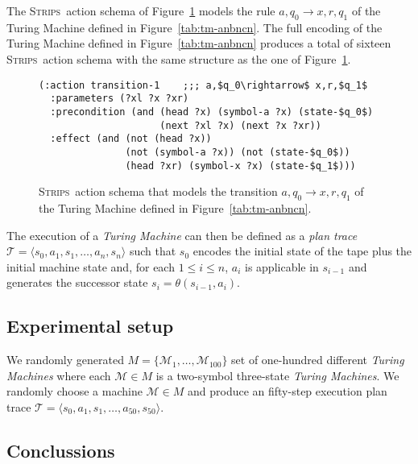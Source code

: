 \documentclass[letterpaper]{article} %
\newcommand{\tup}[1]{{\langle #1 \rangle}}
\newcommand{\strips}{\textsc{Strips}}     %
\begin{document}
The \strips\ action schema of Figure~\ref{fig:update-rule} models the rule $a,q_0\rightarrow x,r,q_1$ of the Turing Machine defined in Figure~\ref{tab:tm-anbncn}. The full encoding of the Turing Machine defined in Figure~\ref{tab:tm-anbncn} produces a total of sixteen \strips\ action schema with the same structure as the one of Figure~\ref{fig:update-rule}. 
\begin{figure}[hbt!]
\begin{scriptsize}
\begin{lstlisting}
(:action transition-1    ;;; a,$q_0\rightarrow$ x,r,$q_1$
  :parameters (?xl ?x ?xr)
  :precondition (and (head ?x) (symbol-a ?x) (state-$q_0$)
                     (next ?xl ?x) (next ?x ?xr))
  :effect (and (not (head ?x)) 
               (not (symbol-a ?x)) (not (state-$q_0$))
               (head ?xr) (symbol-x ?x) (state-$q_1$)))
\end{lstlisting}
\end{scriptsize}
 \caption{\small \strips\ action schema that models the transition $a,q_0\rightarrow x,r,q_1$ of the Turing Machine defined in Figure~\ref{tab:tm-anbncn}.}
\label{fig:update-rule}
\end{figure}

The execution of a {\em Turing Machine} can then be defined as a {\em plan trace} $\mathcal{T}=\tup{s_0,a_1,s_1,\ldots,a_n,s_n}$ such that $s_0$ encodes the initial state of the tape plus the initial machine state and, for each {\small $1\leq i\leq n$}, $a_i$ is applicable in $s_{i-1}$ and generates the successor state $s_i=\theta(s_{i-1},a_i)$. 

\subsection{Experimental setup}
We randomly generated $M=\{\mathcal{M}_1,\ldots,\mathcal{M}_{100}\}$ set of one-hundred different {\em Turing Machines} where each $\mathcal{M}\in M$ is a two-symbol three-state {\em Turing Machines}. We randomly choose a machine $\mathcal{M}\in M$ and produce an fifty-step execution plan trace $\mathcal{T}=\tup{s_0,a_1,s_1,\ldots,a_{50},s_{50}}$.

\subsection{Conclussions}
\label{sec:conclussions}



\end{document}
